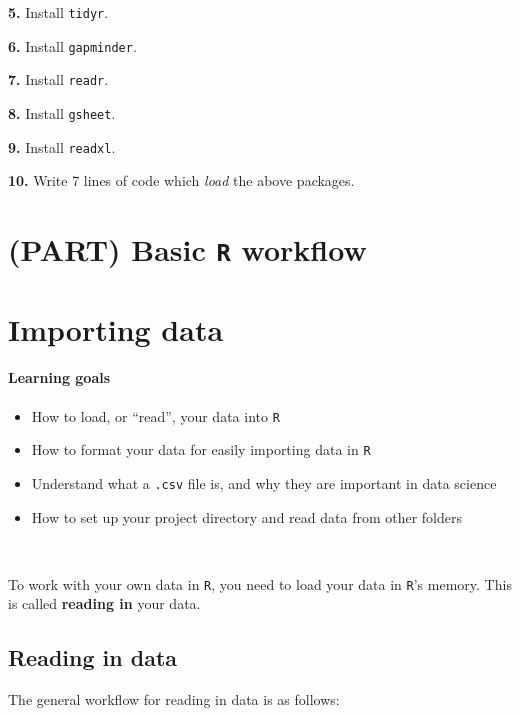 \documentclass[
]{book}
\providecommand{\tightlist}{%
  \setlength{\itemsep}{0pt}\setlength{\parskip}{0pt}}
\begin{document}
\textbf{5.} Install \texttt{tidyr}.

\textbf{6.} Install \texttt{gapminder}.

\textbf{7.} Install \texttt{readr}.

\textbf{8.} Install \texttt{gsheet}.

\textbf{9.} Install \texttt{readxl}.

\textbf{10.} Write 7 lines of code which \emph{load} the above packages.

\chapter*{\texorpdfstring{(PART) Basic \texttt{R} workflow}{(PART) Basic R workflow}}\label{part-basic-r-workflow}

\chapter{Importing data}\label{importing-data}

\subsubsection*{Learning goals}\label{learning-goals-8}

\begin{itemize}
\tightlist
\item
  How to load, or ``read'', your data into \texttt{R}
\item
  How to format your data for easily importing data in \texttt{R}
\item
  Understand what a \texttt{.csv} file is, and why they are important in data science
\item
  How to set up your project directory and read data from other folders
\end{itemize}

~

To work with your own data in \texttt{R}, you need to load your data in \texttt{R}'s memory. This is called \textbf{reading in} your data.

\section*{Reading in data}\label{reading-in-data}

The general workflow for reading in data is as follows:
\end{document}
